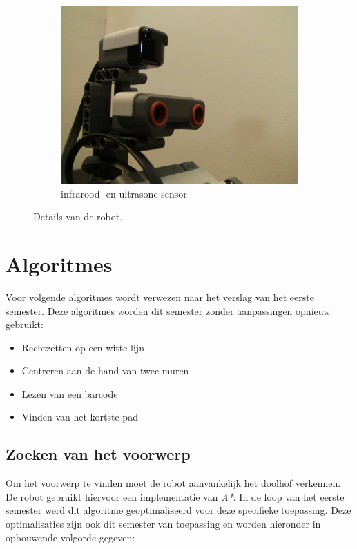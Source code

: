 \documentclass[tt2]{penoverslag}
\begin{document}
\begin{figure}
\begin{subfigure}[h]{0.33\textwidth}
		\includegraphics[width=\textwidth]{robotSensoren}
		\caption{infrarood- en ultrasone sensor}
	\end{subfigure}
\caption{Details van de robot.}
\label{fig:robotDetail}
\end{figure}


\section{Algoritmes}
Voor volgende algoritmes wordt verwezen naar het verslag van het eerste semester. Deze algoritmes worden dit semester zonder aanpassingen opnieuw gebruikt:
\begin{itemize}
	\item Rechtzetten op een witte lijn
	\item Centreren aan de hand van twee muren
	\item Lezen van een barcode
	\item Vinden van het kortste pad
\end{itemize}

\subsection{Zoeken van het voorwerp} %
\label{ssec:algoZoek}
Om het voorwerp te vinden moet de robot aanvankelijk het doolhof verkennen. De robot gebruikt hiervoor een implementatie van \textit{A*}. In de loop van het eerste semester werd dit algoritme geoptimaliseerd voor deze specifieke toepassing. Deze optimalisaties zijn ook dit semester van toepassing en worden hieronder in opbouwende volgorde gegeven: \\
\end{document}

